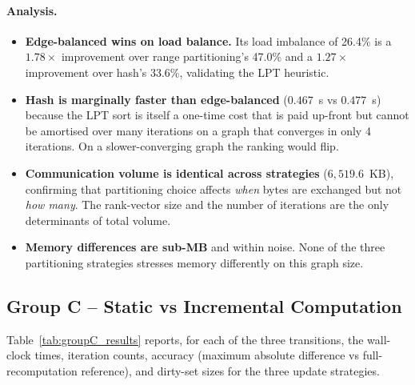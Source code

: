 \documentclass[11pt,a4paper]{article}
\begin{document}
\paragraph{Analysis.}
\begin{itemize}
    \item \textbf{Edge-balanced wins on load balance.} Its load
    imbalance of 26.4\% is a $1.78\times$ improvement over range
    partitioning's 47.0\% and a $1.27\times$ improvement over hash's
    33.6\%, validating the LPT heuristic.
    \item \textbf{Hash is marginally faster than edge-balanced} ($0.467$~s
    vs $0.477$~s) because the LPT sort is itself a one-time cost that
    is paid up-front but cannot be amortised over many iterations on a
    graph that converges in only 4 iterations. On a slower-converging
    graph the ranking would flip.
    \item \textbf{Communication volume is identical across strategies}
    ($6{,}519.6$~KB), confirming that partitioning choice affects
    \emph{when} bytes are exchanged but not \emph{how many}. The
    rank-vector size and the number of iterations are the only
    determinants of total volume.
    \item \textbf{Memory differences are sub-MB} and within noise. None
    of the three partitioning strategies stresses memory differently
    on this graph size.
\end{itemize}

\subsection{Group C -- Static vs Incremental Computation}
\label{sec:res-group-c}

Table~\ref{tab:groupC_results} reports, for each of the three
transitions, the wall-clock times, iteration counts, accuracy
(maximum absolute difference vs full-recomputation reference), and
dirty-set sizes for the three update strategies.
\end{document}
